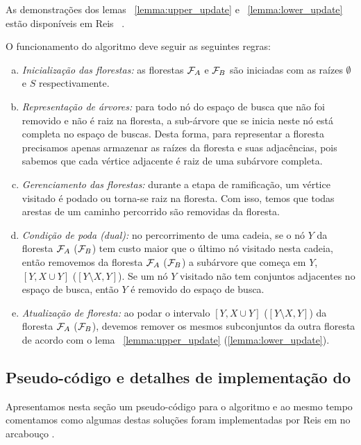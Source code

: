 As demonstrações dos lemas ~\ref{lemma:upper_update} e 
~\ref{lemma:lower_update} estão disponíveis em Reis ~\cite{Rei12}.

O funcionamento do algoritmo deve seguir as seguintes regras:
\begin{enumerate}[a)]
    \item{\it Inicialização das florestas:} as florestas $\mathcal{F}_A$ e 
        $\mathcal{F}_B$ são iniciadas com as raízes $\emptyset$ e $S$ 
        respectivamente. \label{pfs:rule:a}
    \item{\it Representação de árvores:} para todo nó do espaço de busca 
        que não foi removido e não é raiz na floresta, a sub-árvore que
        se inicia neste nó está completa no espaço de buscas. Desta 
        forma, para representar a floresta precisamos apenas armazenar
        as raízes da floresta e suas adjacências, pois sabemos que cada
        vértice adjacente é raiz de uma subárvore completa. 
        \label{pfs:rule:b}
    \item{\it Gerenciamento das florestas:} durante a etapa de 
        ramificação, um vértice visitado é podado ou torna-se raiz na 
        floresta. Com isso, temos que todas arestas de um caminho 
        percorrido são removidas da floresta. \label{pfs:rule:c}
    \item{\it Condição de poda (dual):} no percorrimento de uma cadeia,
        se o nó $Y$ da floresta $\mathcal{F}_A$ ($\mathcal{F}_B$) tem custo 
        maior que o último nó visitado nesta cadeia, então removemos da
        floresta $\mathcal{F}_A$ ($\mathcal{F}_B$) a subárvore que
        começa em $Y$, $[Y, X \cup Y]$ ($[Y \setminus X, Y]$). Se um nó
        $Y$ visitado não tem conjuntos adjacentes no espaço de busca, 
        então $Y$ é removido do espaço de busca.
        \label{pfs:rule:d}
    \item{\it Atualização de floresta:} ao podar o intervalo 
        $[Y, X \cup Y]$ ($[Y \setminus X, Y]$) da floresta $\mathcal{F}_A$
        ($\mathcal{F}_B$), devemos remover os mesmos subconjuntos da outra
        floresta de acordo com o lema ~\ref{lemma:upper_update}
        (\ref{lemma:lower_update}). \label{pfs:rule:e}
\end{enumerate}


\subsection{Pseudo-código e detalhes de implementação do }
Apresentamos nesta seção um pseudo-código para o algoritmo e ao mesmo
tempo comentamos como algumas destas soluções foram implementadas por
Reis em  no arcabouço .

